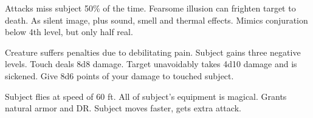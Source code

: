 \begin{swspelllist}
   Attacks miss subject 50\% of the time.
   Fearsome illusion can frighten target to death.
   As silent image, plus sound, smell and thermal effects.
   Mimics conjuration below 4th level, but only half real.

   Creature suffers penalties due to debilitating pain.
   Subject gains three negative levels.
   Touch deals 8d8 damage.
   Target unavoidably takes 4d10 damage and is sickened.
   Give 8d6 points of your damage to touched subject.

   Subject flies at speed of 60 ft.
   All of subject's equipment is magical.
   Grants natural armor and DR.
   Subject moves faster, gets extra attack.
  \spellheadrestricted{}
\end{swspelllist}

